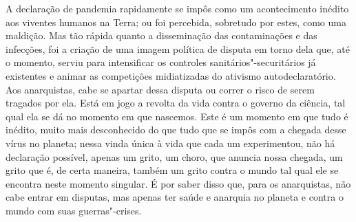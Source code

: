 A declaração de pandemia rapidamente se impôs como um acontecimento
inédito aos viventes humanos na Terra; ou foi percebida, sobretudo por
estes, como uma maldição. Mas tão rápida quanto a disseminação das
contaminações e das infecções, foi a criação de uma imagem política de
disputa em torno dela que, até o momento, serviu para intensificar os
controles sanitários"-securitários já existentes e animar as competições
midiatizadas do ativismo autodeclaratório. Aos anarquistas, cabe se
apartar dessa disputa ou correr o risco de serem tragados por ela. Está
em jogo a revolta da vida contra o governo da ciência, tal qual ela se
dá no momento em que nascemos. Este é um momento em que tudo é inédito,
muito mais desconhecido do que tudo que se impôs com a chegada desse
vírus no planeta; nessa vinda única à vida que cada um experimentou, não
há declaração possível, apenas um grito, um choro, que anuncia nossa
chegada, um grito que é, de certa maneira, também um grito contra o
mundo tal qual ele se encontra neste momento singular. É por saber disso
que, para os anarquistas, não cabe entrar em disputas, mas apenas ter
saúde e anarquia no planeta e contra o mundo com suas guerras"-crises.


